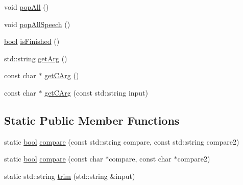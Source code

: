 \begin{DoxyCompactItemize}
\item 
void \hyperlink{classStringstack_a787094ae6c979c8d1f81498b0743f4ad}{pop\-All} ()
\item 
void \hyperlink{classStringstack_a867ab3e162e7ae1012d105b8a210df50}{pop\-All\-Speech} ()
\item 
\hyperlink{structs_8h_ad5c9d4ba3dc37783a528b0925dc981a0}{bool} \hyperlink{classStringstack_afe0023a8e89792617fd595d400571faa}{is\-Finished} ()
\item 
std\-::string \hyperlink{classStringstack_a97dbddf508815857bf97c7310b70c913}{get\-Arg} ()
\item 
const char $\ast$ \hyperlink{classStringstack_a246ba7090b700205b9e8321902fa6e5c}{get\-C\-Arg} ()
\item 
const char $\ast$ \hyperlink{classStringstack_aaeea1c99e035be5237e18477f5a00afd}{get\-C\-Arg} (const std\-::string input)
\end{DoxyCompactItemize}
\subsection*{Static Public Member Functions}
\begin{DoxyCompactItemize}
\item 
static \hyperlink{structs_8h_ad5c9d4ba3dc37783a528b0925dc981a0}{bool} \hyperlink{classStringstack_a3a92a82a838b77bedc268372e8fe7a41}{compare} (const std\-::string compare, const std\-::string compare2)
\item 
static \hyperlink{structs_8h_ad5c9d4ba3dc37783a528b0925dc981a0}{bool} \hyperlink{classStringstack_a8d8758c37734f6f45d6f5177dcc1a922}{compare} (const char $\ast$compare, const char $\ast$compare2)
\item 
static std\-::string \hyperlink{classStringstack_ad7a1dcd59e92618fc6a52bba41e5854c}{trim} (std\-::string \&input)
\end{DoxyCompactItemize}


